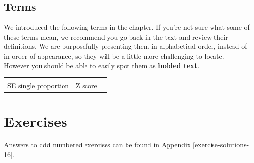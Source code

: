 \documentclass[
  10pt,
  openany]{book}
\begin{document}
\hypertarget{terms-9}{%
\subsection{Terms}\label{terms-9}}

We introduced the following terms in the chapter.
If you're not sure what some of these terms mean, we recommend you go back in the text and review their definitions.
We are purposefully presenting them in alphabetical order, instead of in order of appearance, so they will be a little more challenging to locate.
However you should be able to easily spot them as \textbf{bolded text}.

\begin{tabu} to 
\toprule
{} &  & \\
SE single proportion & Z score & \\
\bottomrule
\end{tabu}

\clearpage

\hypertarget{chp16-exercises}{%
\section{Exercises}\label{chp16-exercises}}

Answers to odd numbered exercises can be found in Appendix \ref{exercise-solutions-16}.
\end{document}
